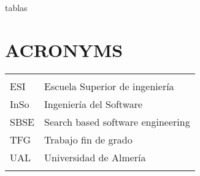 


\setcounter{secnumdepth}{3} %
\setcounter{tocdepth}{3} %



\renewcommand\contentsname{CONTENTS}
\renewcommand\listfigurename{FIGURE LIST}
\renewcommand\listtablename{TABLE LIST}
\tableofcontents
\listoffigures %
\listoftables  tablas
\lstlistoflistings 





\clearpage
\vspace{0.2cm}
\section*{ACRONYMS}

\begin{tabular}{ l   |    l  }
	

&\\
   ESI & Escuela Superior de ingeniería \\
   InSo & Ingeniería del Software \\
    SBSE& Search based software engineering\\
   TFG & Trabajo fin de grado\\
   
      UAL & Universidad de Almería \\
      &\\

\end{tabular}



